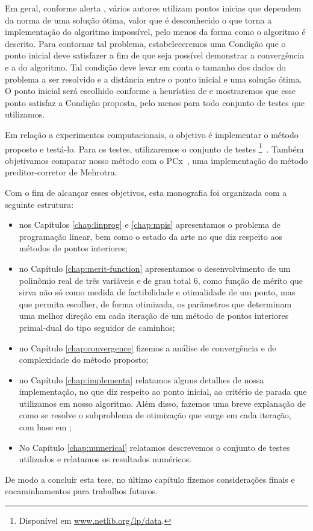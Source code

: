 Em geral, conforme alerta \textcite[p. 112]{Wright:Primal-dual-interior-point:1997h}, vários autores utilizam pontos inicias que dependem da norma de uma solução ótima, valor que é desconhecido o que torna a implementação do algoritmo impossível, pelo menos da forma como o algoritmo é descrito.  
 Para contornar tal problema,  estabeleceremos uma Condição que o ponto inicial deve satisfazer a fim de que seja possível demonstrar a convergência e a  do algoritmo. Tal condição deve levar  em conta o tamanho dos dados do problema a  ser  resolvido e a distância entre o ponto inicial e uma solução ótima.  O ponto inicial será escolhido conforme a heurística de \textcite{Mehrotra:1992wr} e mostraremos que esse ponto satisfaz a Condição proposta, pelo menos para todo conjunto de testes que utilizamos. 



Em relação a experimentos computacionais, o objetivo é implementar o método proposto e testá-lo. Para os testes, utilizaremos o conjunto de testes \Netlib\footnote{Disponível em \url{www.netlib.org/lp/data}.}~\cite{Dongarra:1987jk,Gay:1985ts}. Também objetivamos comparar nosso método com o PCx~\cite{Czyzyk:1999hk}, uma implementação do método preditor-corretor de Mehrotra. 



Com o fim de alcançar  esses objetivos, esta monografia foi organizada com a seguinte estrutura: 

\begin{itemize}

	\item nos Capítulos \ref{chap:linprog} e  \ref{chap:mpis} apresentamos o problema de programação linear, bem como o estado da arte no que diz respeito aos métodos de pontos interiores; 
\item no Capítulo \ref{chap:merit-function} apresentamos o
desenvolvimento de um polinômio real de três variáveis e de grau total 6, como função de mérito  que sirva não só como medida
de factibilidade e otimalidade de um ponto, mas que permita escolher, de forma
otimizada, os parâmetros que determinam uma melhor direção em cada iteração
de um método de pontos interiores primal-dual do tipo seguidor de caminhos; 
\item no Capítulo \ref{chap:convergence} fizemos a análise de convergência e de complexidade do método proposto; 
\item no Capítulo \ref{chap:implementa}  relatamos alguns detalhes de nossa implementação, no que diz respeito  ao ponto inicial, ao critério de parada que utilizamos em nosso algoritmo. Além disso, fazemos uma breve explanação de como se resolve o subproblema de otimização que surge em cada iteração, com base em \cite{VillasBoas2013:wn,VillasBoas:2003tg,VillasBoas:2012ur};

\item No Capítulo  \ref{chap:numerical} relatamos descrevemos o conjunto de testes utilizados e relatamos os resultados  numéricos.


\end{itemize}

 De modo a  concluir esta tese, no último capítulo fizemos considerações finais e encaminhamentos para trabalhos futuros.

